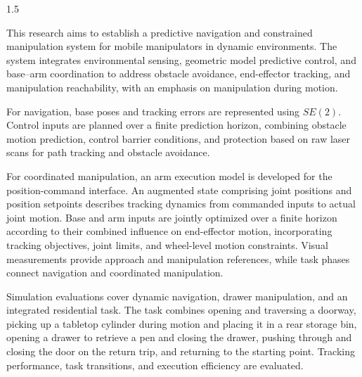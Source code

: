 \begin{abstracten}
\begin{spacing}{1.5}

This research aims to establish a predictive navigation and constrained manipulation system for mobile manipulators in dynamic environments. The system integrates environmental sensing, geometric model predictive control, and base--arm coordination to address obstacle avoidance, end-effector tracking, and manipulation reachability, with an emphasis on manipulation during motion.

For navigation, base poses and tracking errors are represented using \(SE(2)\). Control inputs are planned over a finite prediction horizon, combining obstacle motion prediction, control barrier conditions, and protection based on raw laser scans for path tracking and obstacle avoidance.

For coordinated manipulation, an arm execution model is developed for the position-command interface. An augmented state comprising joint positions and position setpoints describes tracking dynamics from commanded inputs to actual joint motion. Base and arm inputs are jointly optimized over a finite horizon according to their combined influence on end-effector motion, incorporating tracking objectives, joint limits, and wheel-level motion constraints. Visual measurements provide approach and manipulation references, while task phases connect navigation and coordinated manipulation.

Simulation evaluations cover dynamic navigation, drawer manipulation, and an integrated residential task. The task combines opening and traversing a doorway, picking up a tabletop cylinder during motion and placing it in a rear storage bin, opening a drawer to retrieve a pen and closing the drawer, pushing through and closing the door on the return trip, and returning to the starting point. Tracking performance, task transitions, and execution efficiency are evaluated.

\end{spacing}
\end{abstracten}
